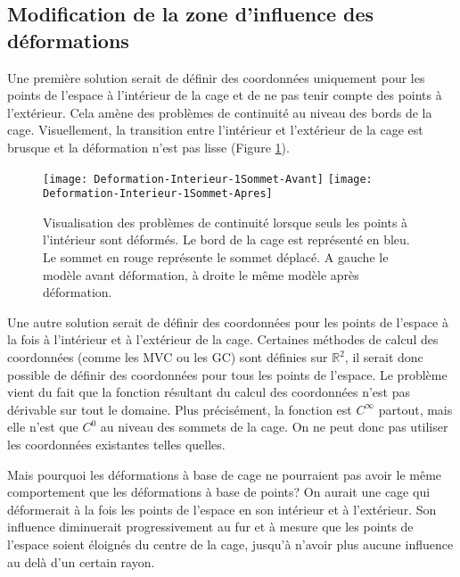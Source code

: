 \subsection{Modification de la zone d'influence des déformations}

Une première solution serait de définir des coordonnées uniquement pour les
points de l'espace à l'intérieur de la cage et de ne pas tenir compte des
points à l'extérieur. Cela amène des problèmes de continuité au niveau des
bords de la cage. Visuellement, la transition entre l'intérieur et l'extérieur
de la cage est brusque et la déformation n'est pas lisse (Figure \ref{MELVI}).

\begin{figure}[ht]
  \begin{center}
    \scalebox{0.2}
    {
      \texttt{[image: Deformation-Interieur-1Sommet-Avant]}
      \texttt{[image: Deformation-Interieur-1Sommet-Apres]}
    }

    \caption{Visualisation des problèmes de continuité lorsque seuls les
points à l'intérieur sont déformés. Le bord de la cage est représenté en bleu.
Le sommet en rouge représente le sommet déplacé. A gauche le modèle avant
déformation, à droite le même modèle après déformation.}

    \label{MELVI}
  \end{center}
\end{figure}

Une autre solution serait de définir des coordonnées pour les points de
l'espace à la fois à l'intérieur et à l'extérieur de la cage. Certaines
méthodes de calcul des coordonnées (comme les MVC ou les GC) sont définies sur
$\mathbb{R}^2$, il serait donc possible de définir des coordonnées pour tous
les points de l'espace. Le problème vient du fait que la fonction résultant du
calcul des coordonnées n'est pas dérivable sur tout le domaine. Plus
précisément, la fonction est $C^{\infty}$ partout, mais elle n'est que $C^0$
au niveau des sommets de la cage. On ne peut donc pas utiliser les coordonnées
existantes telles quelles.

Mais pourquoi les déformations à base de cage ne pourraient pas avoir le même
comportement que les déformations à base de points? On aurait une cage qui
déformerait à la fois les points de l'espace en son intérieur et à
l'extérieur.  Son influence diminuerait progressivement au fur et à mesure que
les points de l'espace soient éloignés du centre de la cage, jusqu'à n'avoir
plus aucune influence au delà d'un certain rayon.

